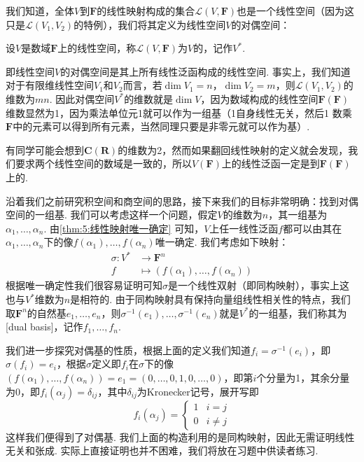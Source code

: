 我们知道，全体$V$到$\mathbf{F}$的线性映射构成的集合$\mathcal{L}(V,\mathbf{F})$也是一个线性空间（因为这只是$\mathcal{L}(V_1,V_2)$的特例），我们将其定义为线性空间$V$的对偶空间：
\begin{definition}
    设$V$是数域$\mathbf{F}$上的线性空间，称$\mathcal{L}(V,\mathbf{F})$为$V$的，记作$V^*$.
\end{definition}

即线性空间$V$的对偶空间是其上所有线性泛函构成的线性空间. 事实上，我们知道对于有限维线性空间$V_1$和$V_2$而言，若$\dim V_1=n$，$\dim V_2=m$，则$\mathcal{L}(V_1,V_2)$的维数为$mn$. 因此对偶空间$V^*$的维数就是$\dim V$，因为数域构成的线性空间$\mathbf{F}(\mathbf{F})$维数显然为1，因为乘法单位元1就可以作为一组基（1自身线性无关，然后1
数乘$\mathbf{F}$中的元素可以得到所有元素，当然同理只要是非零元就可以作为基）.

有同学可能会想到$\mathbf{C}(\mathbf{R})$的维数为2，然而如果翻回线性映射的定义就会发现，我们要求两个线性空间的数域是一致的，所以$V(\mathbf{F})$上的线性泛函一定是到$\mathbf{F}(\mathbf{F})$上的.

沿着我们之前研究积空间和商空间的思路，接下来我们的目标非常明确：找到对偶空间的一组基. 我们可以考虑这样一个问题，假定$V$的维数为$n$，其一组基为$\alpha_1,\ldots,\alpha_n$. 由\autoref{thm:5:线性映射唯一确定} 可知，$V$上任一线性泛函$f$都可以由其在$\alpha_1,\ldots,\alpha_n$下的像$f(\alpha_1),\ldots,f(\alpha_n)$唯一确定. 我们考虑如下映射：
\begin{align*}
    \sigma:V^* & \to\mathbf{F}^n                         \\
    f          & \mapsto(f(\alpha_1),\ldots,f(\alpha_n))
\end{align*}
根据唯一确定性我们很容易证明可知$\sigma$是一个线性双射（即同构映射），事实上这也与$V^*$维数为$n$是相符的. 由于同构映射具有保持向量组线性相关性的特点，我们取$\mathbf{F}^n$的自然基$e_1,\ldots,e_n$，则$\sigma^{-1}(e_1),\ldots,\sigma^{-1}(e_n)$就是$V^*$的一组基，我们称其为[dual basis]，记作$f_1,\ldots,f_n$.

我们进一步探究对偶基的性质，根据上面的定义我们知道$f_i=\sigma^{-1}(e_i)$，即$\sigma(f_i)=e_i$，根据$\sigma$定义即$f_i$在$\sigma$下的像$(f(\alpha_1),\ldots,f(\alpha_n))=e_1=(0,\ldots,0,1,0,\ldots,0)$，即第$i$个分量为1，其余分量为0，即$f_i(\alpha_j)=\delta_{ij}$，其中$\delta_{ij}$为Kronecker记号，展开写即\[f_i(\alpha_j)=\begin{cases}
        1 & i=j     \\
        0 & i\neq j
    \end{cases}\]
这样我们便得到了对偶基. 我们上面的构造利用的是同构映射，因此无需证明线性无关和张成. 实际上直接证明也并不困难，我们将放在习题中供读者练习.

